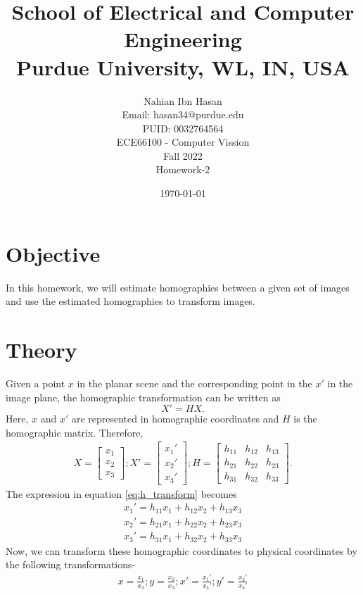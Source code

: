 \documentclass{article}
\title{School of Electrical and Computer Engineering\\
Purdue University, WL, IN, USA}
\author{Nahian Ibn Hasan\\
Email: hasan34@purdue.edu\\
PUID: 0032764564\\
ECE66100 - Computer Vission\\
Fall 2022\\
Homework-2}
\date{\today}
\begin{document}
\maketitle
\section{Objective}
In this homework, we will estimate homographies between a given set of images and use the estimated homographies to transform images.
\section{Theory}
Given a point $x$ in the planar scene and the corresponding point in the $x'$ in the image plane, the homographic transformation can be written as
\begin{equation}
	X' = HX.
	\label{eq:h_transform}
\end{equation}
Here, $x$ and $x'$ are represented in homographic coordinates and $H$ is the homographic matrix. Therefore,
\begin{eqnarray}
	X = \begin{bmatrix}
		x_1 \\ x_2 \\x_3
	\end{bmatrix};
	X' = \begin{bmatrix}
		x_1' \\ x_2' \\ x_3'
	\end{bmatrix};
	H = \begin{bmatrix}
		h_{11} & h_{12} & h_{13} \\
		h_{21} & h_{22} & h_{23} \\
		h_{31} & h_{32} & h_{33}
	\end{bmatrix}.
\end{eqnarray}
The expression in equation \ref{eq:h_transform} becomes
\begin{subequations}
\begin{eqnarray}
	x_1' = h_{11}x_1 + h_{12}x_2 + h_{13}x_3\\
	x_2' = h_{21}x_1 + h_{22}x_2 + h_{23}x_3\\
	x_3' = h_{31}x_1 + h_{32}x_2 + h_{33}x_3
	\label{eq:h_transform_2}
\end{eqnarray}
\end{subequations}
Now, we can transform these homographic coordinates to physical coordinates by the following transformations-
\begin{eqnarray}
	x = \frac{x_1}{x_3};
	y = \frac{x_2}{x_3};
	x' = \frac{x_1'}{x_3'};
	y' = \frac{x_2'}{x_3'}
	\label{eq:h_transform_3}
\end{eqnarray}
\end{document}
